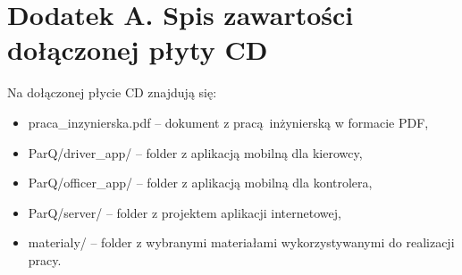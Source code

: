 \section*{Dodatek A. Spis zawartości dołączonej płyty CD}

Na dołączonej płycie CD znajdują się:

\begin{itemize}
	\item praca\_inzynierska.pdf -- dokument z pracą inżynierską w formacie PDF,
	\item ParQ/driver\_app/ -- folder z aplikacją mobilną dla kierowcy,
	\item ParQ/officer\_app/ -- folder z aplikacją mobilną dla kontrolera,
	\item ParQ/server/ -- folder z projektem aplikacji internetowej,
	\item materialy/ -- folder z wybranymi materiałami wykorzystywanymi do realizacji pracy.
\end{itemize}
